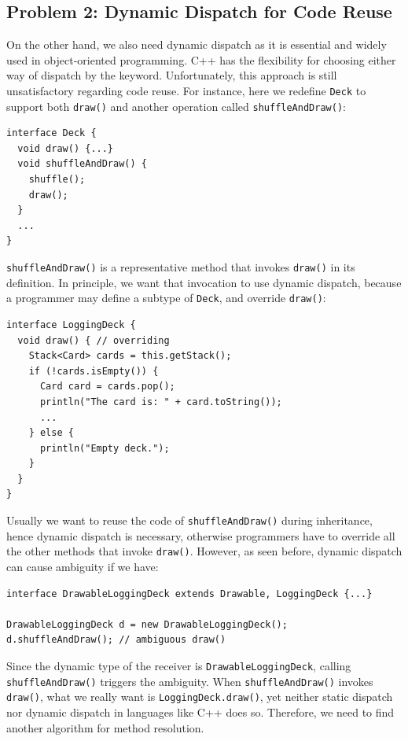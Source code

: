 \subsection{Problem 2: Dynamic Dispatch for Code Reuse}
On the other hand, we also need dynamic dispatch as it is essential and widely used in object-oriented programming.
C++ has the flexibility for choosing either way of dispatch by the \kwvirtual{} keyword.
Unfortunately, this approach is still unsatisfactory regarding code reuse. For instance, here we redefine \lstinline|Deck| to support
both \lstinline|draw()| and another operation called \lstinline|shuffleAndDraw()|:
\vspace{3pt}\begin{lstlisting}
interface Deck {
  void draw() {...}
  void shuffleAndDraw() {
    shuffle();
    draw();
  }
  ...
}
\end{lstlisting}\vspace{3pt}
\lstinline|shuffleAndDraw()| is a representative method that invokes \lstinline|draw()| in its definition. In principle, we want
that invocation to use dynamic dispatch, because a programmer may define a subtype of \lstinline|Deck|, and override \lstinline|draw()|:
\vspace{3pt}\begin{lstlisting}
interface LoggingDeck {
  void draw() { // overriding
    Stack<Card> cards = this.getStack();
    if (!cards.isEmpty()) {
      Card card = cards.pop();
      println("The card is: " + card.toString());
      ...
    } else {
      println("Empty deck.");
    }
  }
}
\end{lstlisting}\vspace{3pt}
Usually we want to reuse the code of \lstinline|shuffleAndDraw()| during inheritance, hence dynamic dispatch is necessary, otherwise
programmers have to override all the other methods that invoke \lstinline|draw()|. However, as seen before, dynamic dispatch can cause
ambiguity if we have:
\vspace{3pt}\begin{lstlisting}
interface DrawableLoggingDeck extends Drawable, LoggingDeck {...}

DrawableLoggingDeck d = new DrawableLoggingDeck();
d.shuffleAndDraw(); // ambiguous draw()
\end{lstlisting}\vspace{3pt}
Since the dynamic type of the receiver is \lstinline|DrawableLoggingDeck|, calling \lstinline|shuffleAndDraw()| triggers the ambiguity. When \lstinline|shuffleAndDraw()| invokes \lstinline|draw()|, what we really want is \lstinline|LoggingDeck.draw()|, yet
neither static dispatch nor dynamic dispatch in languages like C++ does so.
 Therefore, we need to find another algorithm for method resolution.

